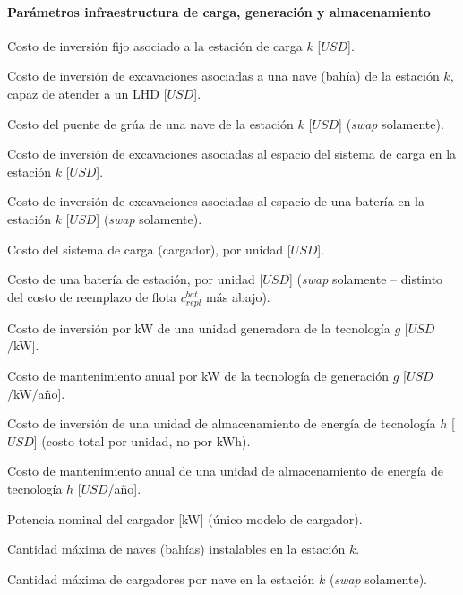 \paragraph{Parámetros infraestructura de carga, generación y almacenamiento}
\begin{description}[leftmargin=3cm, style=nextline]
    \item[$c^{s}_k$] Costo de inversión fijo asociado a la estación de carga $k$ [$USD$].
     \item[$c^{nave}_k$] Costo de inversión de excavaciones asociadas a una nave (bahía) de la estación $k$, capaz de atender a un LHD [$USD$].
     \item[$c^{grua}_k$] Costo del puente de grúa de una nave de la estación $k$ [$USD$] (\textit{swap} solamente).
     \item[$c^{esc}_k$] Costo de inversión de excavaciones asociadas al espacio del sistema de carga en la estación $k$ [$USD$].
     \item[$c^{eb}_k$] Costo de inversión de excavaciones asociadas al espacio de una batería en la estación $k$ [$USD$] (\textit{swap} solamente).
    \item[$c^{sc}$] Costo del sistema de carga (cargador), por unidad [$USD$].
    \item[$c^{bat}$] Costo de una batería de estación, por unidad [$USD$] (\textit{swap} solamente -- distinto del costo de reemplazo de flota $c^{bat}_{repl}$ más abajo).
    \item[$\change{c^{ssee}_k}$] 
    \item [$c_g^{inv}$] Costo de inversión por kW de una unidad generadora de la tecnología $g$ [$USD$/kW].
    \item [$c_g^{op}$] Costo de mantenimiento anual por kW de la tecnología de generación $g$ [$USD$/kW/año].
    \item [$c_h^{inv}$] Costo de inversión de una unidad de almacenamiento de energía de tecnología $h$ [$USD$] (costo total por unidad, no por kWh).
    \item [$c_h^{op}$] Costo de mantenimiento anual de una unidad de almacenamiento de energía de tecnología $h$ [$USD$/año].
    \item[$p^c$] Potencia nominal del cargador [kW] (único modelo de cargador).
    \item[$n_k^{bays}$] Cantidad máxima de naves (bahías) instalables en la estación $k$.
    \item[$n_k^{c/bay}$] Cantidad máxima de cargadores por nave en la estación $k$ (\textit{swap} solamente).

\end{description}

